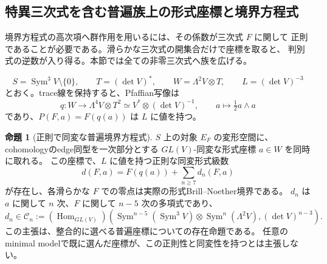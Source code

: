 \documentclass[a4paper,11pt]{ltjsarticle}
\theoremstyle{definition}
\newtheorem{theorem}{命題}[section]
\newcommand{\Sym}{\operatorname{Sym}}
\newcommand{\Hom}{\operatorname{Hom}}
\begin{document}
\subsection{特異三次式を含む普遍族上の形式座標と境界方程式}
\label{subsec:universal-bn-equation}

境界方程式の高次項へ群作用を用いるには、その係数が三次式 $F$ に関して
正則であることが必要である。滑らかな三次式の開集合だけで座標を取ると、
判別式の逆数が入り得る。本節では全ての非零三次式へ族を広げる。

\[
 S=\Sym^3V\setminus\{0\},\qquad
 T=(\det V)^*,\qquad W=\Lambda^2V\otimes T,
 \qquad L=(\det V)^{-3}
\]
とおく。trace線を保持すると、Pfaffian写像は
\[
 q:W\longrightarrow\Lambda^4V\otimes T^2
       \simeq V^*\otimes(\det V)^{-1},
 \qquad a\longmapsto\tfrac12a\wedge a
\]
であり、$P(F,a)=F(q(a))$ は $L$ に値を持つ。

\begin{theorem}[正則で同変な普遍境界方程式]
\label{thm:universal-bn-equation}
$S$ 上の対象 $E_F$ の変形空間に、cohomologyのedge同型を一次部分とする
$GL(V)$-同変な形式座標 $a\in W$ を同時に取れる。
この座標で、$L$ に値を持つ正則な同変形式級数
\begin{equation}\label{eq:universal-bn-series}
 d(F,a)=F(q(a))+\sum_{n\ge7}d_n(F,a)
\end{equation}
が存在し、各滑らかな $F$ での零点は実際の形式Brill--Noether境界である。
$d_n$ は $a$ に関して $n$ 次、$F$ に関して $n-5$ 次の多項式であり、
\begin{equation}\label{eq:universal-bn-covariants}
 d_n\in\mathcal C_n:=(\Hom_{GL(V)})\!\left(
 \Sym^{n-5}(\Sym^3V)\otimes\Sym^n(\Lambda^2V),
 (\det V)^{n-3}\right).
\end{equation}
この主張は、整合的に選べる普遍座標についての存在命題である。
任意のminimal modelで既に選んだ座標が、この正則性と同変性を持つとは主張しない。
\end{theorem}
\end{document}
